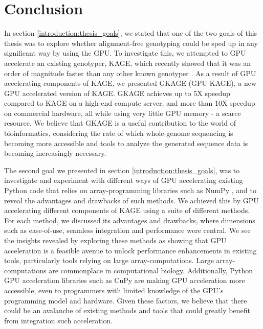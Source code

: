 \section{Conclusion} \label{conclusion}
In section \ref{introduction:thesis_goals}, we stated that one of the two goals of this thesis was to explore whether alignment-free genotyping could be sped up in any significant way by using the GPU.
To investigate this, we attempted to GPU accelerate an existing genotyper, KAGE, which recently showed that it was an order of magnitude faster than any other known genotyper \cite{kage}.
As a result of GPU accelerating components of KAGE, we presented GKAGE (GPU KAGE), a new GPU accelerated version of KAGE.
GKAGE achieves up to 5X speedup compared to KAGE on a high-end compute server, and more than 10X speedup on commercial hardware, all while using very little GPU memory - a scarce resource.
We believe that GKAGE is a useful contribution to the world of bioinformatics, considering the rate of which whole-genome sequencing is becoming more accessible and tools to analyze the generated sequence data is becoming increasingly necessary.

The second goal we presented in section \ref{introduction:thesis_goals}, was to investigate and experiment with different ways of GPU accelerating existing Python code that relies on array-programming libraries such as NumPy \cite{numpy}, and to reveal the advantages and drawbacks of such methods.
We achieved this by GPU accelerating different components of KAGE using a suite of different methods.
For each method, we discussed its advantages and drawbacks, where dimensions such as ease-of-use, seamless integration and performance were central.
We see the insights revealed by exploring these methods as showing that GPU acceleration is a feasible avenue to unlock performance enhancements in existing tools, particularly tools relying on large array-computations.
Large array-computations are commonplace in computational biology.
Additionally, Python GPU acceleration libraries such as CuPy \cite{cupy} are making GPU acceleration more accessible, even to programmers with limited knowledge of the GPU's programming model and hardware.
Given these factors, we believe that there could be an avalanche of existing methods and tools that could greatly benefit from integration such acceleration.
